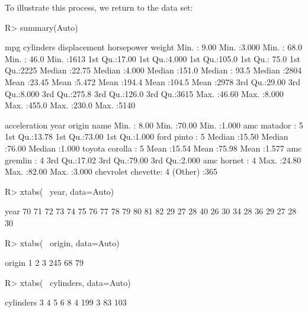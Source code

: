 \documentclass[
]{jss}
\begin{document}
To illustrate this process, we return to the  data set:

\begin{CodeChunk}
\begin{CodeInput}
R> summary(Auto)
\end{CodeInput}
\begin{CodeOutput}
      mpg          cylinders      displacement     horsepower        weight    
 Min.   : 9.00   Min.   :3.000   Min.   : 68.0   Min.   : 46.0   Min.   :1613  
 1st Qu.:17.00   1st Qu.:4.000   1st Qu.:105.0   1st Qu.: 75.0   1st Qu.:2225  
 Median :22.75   Median :4.000   Median :151.0   Median : 93.5   Median :2804  
 Mean   :23.45   Mean   :5.472   Mean   :194.4   Mean   :104.5   Mean   :2978  
 3rd Qu.:29.00   3rd Qu.:8.000   3rd Qu.:275.8   3rd Qu.:126.0   3rd Qu.:3615  
 Max.   :46.60   Max.   :8.000   Max.   :455.0   Max.   :230.0   Max.   :5140  
                                                                               
  acceleration        year           origin                      name    
 Min.   : 8.00   Min.   :70.00   Min.   :1.000   amc matador       :  5  
 1st Qu.:13.78   1st Qu.:73.00   1st Qu.:1.000   ford pinto        :  5  
 Median :15.50   Median :76.00   Median :1.000   toyota corolla    :  5  
 Mean   :15.54   Mean   :75.98   Mean   :1.577   amc gremlin       :  4  
 3rd Qu.:17.02   3rd Qu.:79.00   3rd Qu.:2.000   amc hornet        :  4  
 Max.   :24.80   Max.   :82.00   Max.   :3.000   chevrolet chevette:  4  
                                                 (Other)           :365  
\end{CodeOutput}
\begin{CodeInput}
R> xtabs(~ year, data=Auto)
\end{CodeInput}
\begin{CodeOutput}
year
70 71 72 73 74 75 76 77 78 79 80 81 82 
29 27 28 40 26 30 34 28 36 29 27 28 30 
\end{CodeOutput}
\begin{CodeInput}
R> xtabs(~ origin, data=Auto)
\end{CodeInput}
\begin{CodeOutput}
origin
  1   2   3 
245  68  79 
\end{CodeOutput}
\begin{CodeInput}
R> xtabs(~ cylinders, data=Auto)
\end{CodeInput}
\begin{CodeOutput}
cylinders
  3   4   5   6   8 
  4 199   3  83 103 
\end{CodeOutput}
\end{CodeChunk}
\end{document}
